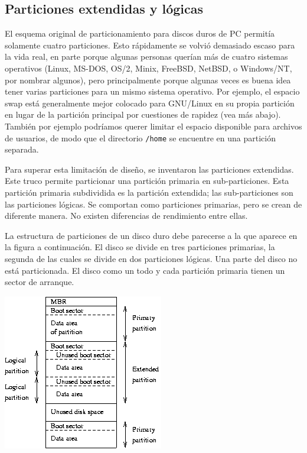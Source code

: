 \documentclass[12pt]{article}
\begin{document}
\subsection*{Particiones extendidas y lógicas}

El esquema original de particionamiento para discos duros de PC permitía 
solamente cuatro particiones. Esto rápidamente se volvió demasiado escaso 
para la vida real, en parte porque algunas personas querían más de cuatro 
sistemas operativos (Linux, MS-DOS, OS/2, Minix, FreeBSD, NetBSD, o 
Windows/NT, por nombrar algunos), pero principalmente 
porque algunas veces es buena idea tener varias particiones para un mismo 
sistema operativo. Por ejemplo, el espacio swap está generalmente mejor 
colocado para GNU/Linux en su propia partición en lugar de la partición 
principal por cuestiones de rapidez (vea más abajo). También por ejemplo 
podríamos querer limitar el espacio disponible 
para archivos de usuarios, de modo que el directorio \texttt{/home} se 
encuentre en una partición separada. 

Para superar esta limitación de diseño, se inventaron las particiones 
extendidas. Este truco permite particionar una partición primaria en 
sub-particiones. Esta partición primaria subdividida es la partición 
extendida; las sub-particiones son las particiones lógicas. Se comportan 
como particiones primarias, pero se crean de diferente manera. No existen
diferencias de rendimiento entre ellas.

La estructura de particiones de un disco duro debe parecerse a la que 
aparece en la figura a continuación. El disco se divide en tres particiones 
primarias, la segunda de las cuales se divide en dos 
particiones lógicas. Una parte del disco no está particionada. El disco 
como un todo y cada partición primaria tienen un sector de arranque.

\begin{center}
 \includegraphics{hd-layout.png}
\end{center}
\end{document}
